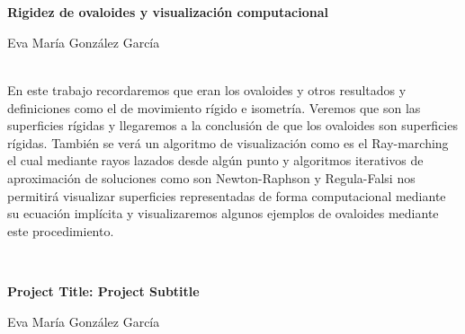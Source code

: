 \chapter*{}






\cleardoublepage
\thispagestyle{empty}

\begin{center}
{\large\bfseries Rigidez de ovaloides y visualización computacional}\\
\end{center}
\begin{center}
Eva María González García\\
\end{center}


\vspace{0.7cm}
\\

En este trabajo recordaremos que eran los ovaloides y otros resultados y definiciones como el de movimiento rígido e isometría. Veremos que son las superficies rígidas y llegaremos a la conclusión de que los ovaloides son superficies rígidas. También se verá un algoritmo de visualización como es el Ray-marching el cual mediante rayos lazados desde algún punto y algoritmos iterativos de aproximación de soluciones como son Newton-Raphson y Regula-Falsi nos permitirá visualizar superficies representadas de forma computacional mediante su ecuación implícita y visualizaremos algunos ejemplos de ovaloides mediante este procedimiento.


\vspace{0.7cm}
\\
\cleardoublepage


\thispagestyle{empty}


\begin{center}
{\large\bfseries Project Title: Project Subtitle}\\
\end{center}
\begin{center}
Eva María González García\\
\end{center}

\vspace{0.7cm}
\\

